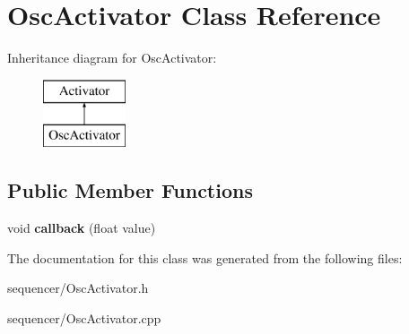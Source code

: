 \hypertarget{classOscActivator}{}\section{Osc\+Activator Class Reference}
\label{classOscActivator}
Inheritance diagram for Osc\+Activator\+:\begin{figure}[H]
\begin{center}
\leavevmode
\includegraphics[height=2.000000cm]{classOscActivator}
\end{center}
\end{figure}
\subsection*{Public Member Functions}
\begin{DoxyCompactItemize}
\item 
void {\bfseries callback} (float value)\hypertarget{classOscActivator_ad5852376e949408b2fc13c8adf60c032}{}\label{classOscActivator_ad5852376e949408b2fc13c8adf60c032}

\end{DoxyCompactItemize}


The documentation for this class was generated from the following files\+:\begin{DoxyCompactItemize}
\item 
sequencer/Osc\+Activator.\+h\item 
sequencer/Osc\+Activator.\+cpp\end{DoxyCompactItemize}
